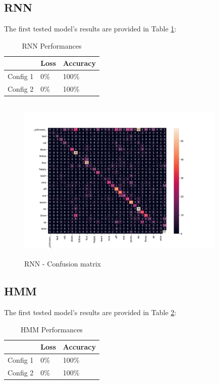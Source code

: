 \subsection{\textbf{RNN}}
The first tested model's results are provided in Table \ref{table:rnn_performances}:\\
\begin{table}[h!]
\centering
\begin{tabular}{ p{1.5cm}|p{1.5cm}|p{1.5cm}| }
 \hline
   & Loss & Accuracy\\
\hline
Config 1 & 0\% & 100\%  \\
Config 2 & 0\% & 100\% \\
\hline
\end{tabular}
\caption{RNN Performances}
\label{table:rnn_performances}
\end{table}

\begin{figure}[h]
			\centering
	    	\includegraphics[width=10cm, height=8cm]{conf_matrix_cnn_dii_cm}
	    	\caption{RNN - Confusion matrix}
	    	\label{fig:conf_matrix_rnn}
\end{figure} 



\subsection{\textbf{HMM}}
The first tested model's results are provided in Table \ref{table:hmm_performances}:\\
\begin{table}[h!]
\centering
\begin{tabular}{ p{1.5cm}|p{1.5cm}|p{1.5cm}| }
 \hline
   & Loss & Accuracy\\
\hline
Config 1 & 0\% & 100\%  \\
Config 2 & 0\% & 100\% \\
\hline
\end{tabular}
\caption{HMM Performances}
\label{table:hmm_performances}
\end{table}

